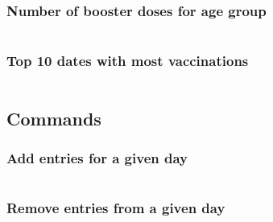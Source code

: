 \documentclass[12pt, a4paper]{article}
\begin{document}
\subsubsection{Number of booster doses for age group}

\begin{tcolorbox}[fontupper=\scriptsize]
    \begin{verbatim}
    \end{verbatim}
\end{tcolorbox}

\noindent
\blindtext

\subsubsection{Top 10 dates with most vaccinations}

\begin{tcolorbox}[fontupper=\scriptsize]
    \begin{verbatim}
    \end{verbatim}
\end{tcolorbox}

\noindent
\blindtext

\subsection{Commands}


\subsubsection{Add entries for a given day}

\begin{tcolorbox}[fontupper=\scriptsize]
    \begin{verbatim}
    \end{verbatim}
\end{tcolorbox}

\noindent
\blindtext

\subsubsection{Remove entries from a given day}

\begin{tcolorbox}[fontupper=\scriptsize]
    \begin{verbatim}
    \end{verbatim}
\end{tcolorbox}
\end{document}
